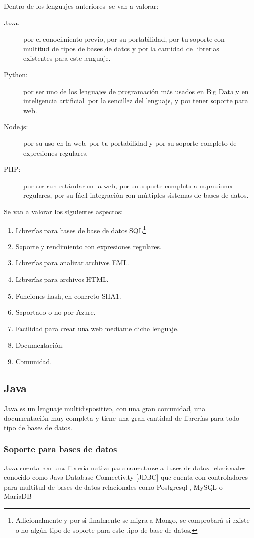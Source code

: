 Dentro de los lenguajes anteriores, se van a valorar: 
\begin{description}
    \item [Java:] por el conocimiento previo, por su portabilidad, por tu soporte con multitud de tipos de bases de datos y por la cantidad de librerías existentes para este lenguaje.
    \item [Python:] por ser uno de los lenguajes de programación más usados en Big Data y en inteligencia artificial, por la sencillez del lenguaje, y por tener soporte para web.
    \item [Node.js:] por su uso en la web, por tu portabilidad y por su soporte completo de expresiones regulares.
    \item [PHP:] por ser run estándar en la web, por su soporte completo a expresiones regulares, por su fácil integración con múltiples sistemas de bases de datos. 
\end{description}

Se van a valorar los siguientes aspectos:
\begin{enumerate}
    \item Librerías para bases de base de datos SQL\footnote{Adicionalmente y por si finalmente se migra a Mongo, se comprobará si existe o no algún tipo de soporte para este tipo de base de datos.}
    \item Soporte y rendimiento con expresiones regulares.
    \item Librerías para analizar archivos EML.
    \item Librerías para archivos HTML. 
    \item Funciones hash, en concreto SHA1.
    \item Soportado o no por Azure.
    \item Facilidad para crear una web mediante dicho lenguaje.
    \item Documentación.
    \item Comunidad.
\end{enumerate}

\subsection{Java}
Java es un lenguaje multidispositivo, con una gran comunidad, una documentación muy completa y tiene una gran cantidad de librerías para todo tipo de bases de datos. 
\subsubsection{Soporte para bases de datos}
Java cuenta con una librería nativa para conectarse a bases de datos relacionales conocido como Java Database Connectivity [JDBC] \cite{JDBC_oracle} que cuenta con controladores para multitud de bases de datos relacionales como Postgresql \cite{JDBC_postgresql}, MySQL \cite{JDBC_MySQL} o MariaDB \cite{JDBC_MariaDB}

